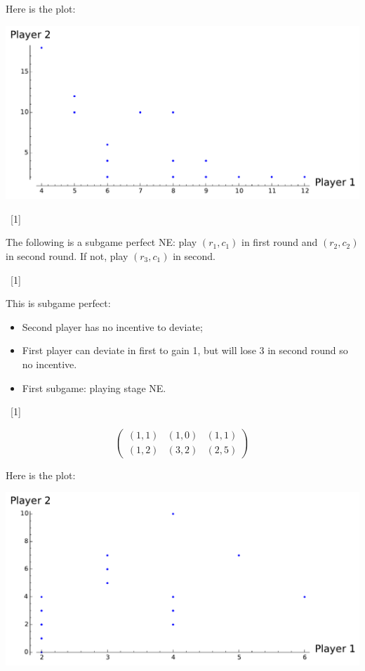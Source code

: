 \documentclass[12pt,a4paper]{article}
\begin{document}
\begin{enumerate}
\begin{enumerate}
            Here is the plot:

            \begin{center}
                \includegraphics[width=.6\textwidth]{plots/resit-sol-2013-2014-plt03.pdf}
            \end{center}

            ~\hfill[1]

            The following is a subgame perfect NE: play \((r_1, c_1)\) in first
            round and \((r_2, c_2)\) in second round. If not, play \((r_3, c_1)\) in second.

            ~\hfill[1]

            This is subgame perfect:

            \begin{itemize}
                \item Second player has no incentive to deviate;
                \item First player can deviate in first to gain 1, but will
                    lose 3 in second round so no incentive.
                \item First subgame: playing stage NE.
            \end{itemize}

            ~\hfill[1]

            \[
                \begin{pmatrix}
                    (1,1) & (1,0) & (1,1)\\
                    (1,2) & (3,2) & (2,5)
                \end{pmatrix}
            \]

            Here is the plot:

            \begin{center}
                \includegraphics[width=.6\textwidth]{plots/resit-sol-2013-2014-plt04.pdf}
            \end{center}


\end{enumerate}
\end{enumerate}
\end{document}

